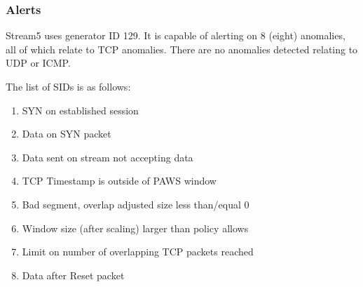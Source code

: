 \documentclass[english]{report}
\newenvironment{note}{
\samepage
    \vspace{10pt}{\textsf{
        {\hspace{7pt}\Huge{$\triangle$\hspace{-12.5pt}{\Large{$^!$}}}}\hspace{5pt}
        {\Large{NOTE}}
    }
    }
   \begin{center}
    \par\vspace{-17pt}

    \begin{lrbox}{\savepar}
    \begin{minipage}[r]{6in}
}
{
    \end{minipage}
    \end{lrbox}
    \fbox{
        \usebox{
            \savepar
	}
    }
    \par\vskip10pt
    \end{center}
}
\newenvironment{note}{
        \begin{rawhtml}
        <p><table border="1"><tr><td><b>
        Note:&nbsp;&nbsp;</b>
        \end{rawhtml}
}{
        \begin{rawhtml}
        </b></td></tr></table></p>
        \end{rawhtml}
}
\begin{document}
\subsubsection{Alerts}
Stream5 uses generator ID 129.  It is capable of alerting on 8 (eight)
anomalies, all of which relate to TCP anomalies.  There are no
anomalies detected relating to UDP or ICMP.

The list of SIDs is as follows:
\begin{enumerate}
\item{SYN on established session}
\item{Data on SYN packet}
\item{Data sent on stream not accepting data}
\item{TCP Timestamp is outside of PAWS window}
\item{Bad segment, overlap adjusted size less than/equal 0}
\item{Window size (after scaling) larger than policy allows}
\item{Limit on number of overlapping TCP packets reached}
\item{Data after Reset packet}
\end{enumerate}


\end{document}
